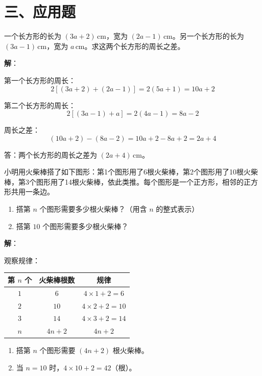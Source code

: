 \documentclass[12pt, a4paper]{ctexart}
\begin{document}
\section*{\textcolor{apppurple}{三、应用题}}

\begin{appbox}[【应用1】长方形面积问题]
一个长方形的长为 $(3a + 2)\,\mathrm{cm}$，宽为 $(2a - 1)\,\mathrm{cm}$。另一个长方形的长为 $(3a - 1)\,\mathrm{cm}$，宽为 $a\,\mathrm{cm}$。求这两个长方形的周长之差。
\end{appbox}

\textbf{解}：

第一个长方形的周长：
\[
2[(3a + 2) + (2a - 1)] = 2(5a + 1) = 10a + 2
\]

第二个长方形的周长：
\[
2[(3a - 1) + a] = 2(4a - 1) = 8a - 2
\]

周长之差：
\[
(10a + 2) - (8a - 2) = 10a + 2 - 8a + 2 = 2a + 4
\]

答：两个长方形的周长之差为 $(2a + 4)\,\mathrm{cm}$。

\begin{appbox}[【应用2】数字规律问题]
小明用火柴棒搭了如下图形：第1个图形用了6根火柴棒，第2个图形用了10根火柴棒，第3个图形用了14根火柴棒，依此类推。每个图形是一个正方形，相邻的正方形共用一条边。

\begin{enumerate}[leftmargin=*]
  \item 搭第 $n$ 个图形需要多少根火柴棒？（用含 $n$ 的整式表示）
  \item 搭第 $10$ 个图形需要多少根火柴棒？
\end{enumerate}
\end{appbox}

\textbf{解}：

观察规律：
\begin{center}
\renewcommand{\arraystretch}{1.3}
\begin{tabular}{ccc}
\toprule
\textbf{第 $n$ 个} & \textbf{火柴棒根数} & \textbf{规律}\\
\midrule
$1$ & $6$ & $4 \times 1 + 2 = 6$\\
$2$ & $10$ & $4 \times 2 + 2 = 10$\\
$3$ & $14$ & $4 \times 3 + 2 = 14$\\
$n$ & $4n + 2$ & $4n + 2$\\
\bottomrule
\end{tabular}
\end{center}

\begin{enumerate}[leftmargin=*]
  \item 搭第 $n$ 个图形需要 $(4n + 2)$ 根火柴棒。
  \item 当 $n = 10$ 时，$4 \times 10 + 2 = 42$（根）。
\end{enumerate}
\end{document}
